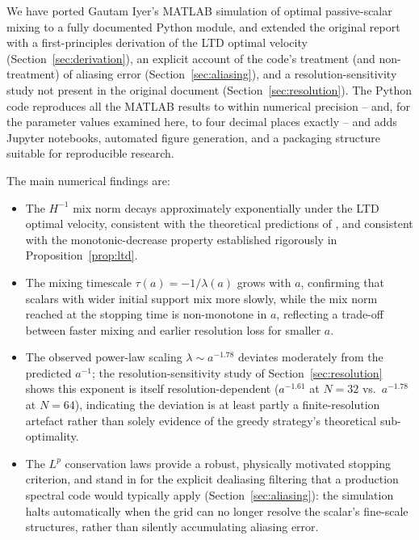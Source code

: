 \documentclass[12pt,a4paper]{article}
\theoremstyle{definition}
\theoremstyle{plain}
\begin{document}
We have ported Gautam Iyer's MATLAB simulation of optimal passive-scalar
mixing to a fully documented Python module, and extended the original
report with a first-principles derivation of the LTD optimal velocity
(Section~\ref{sec:derivation}), an explicit account of the code's
treatment (and non-treatment) of aliasing error (Section~\ref{sec:aliasing}),
and a resolution-sensitivity study not present in the original document
(Section~\ref{sec:resolution}).
The Python code reproduces all the MATLAB results to within numerical
precision -- and, for the parameter values examined here, to four decimal
places exactly -- and adds Jupyter notebooks, automated figure generation,
and a packaging structure suitable for reproducible research.

The main numerical findings are:
\begin{itemize}
  \item The $H^{-1}$ mix norm decays approximately exponentially under the
        LTD optimal velocity, consistent with the theoretical predictions of
        \cite{LTD2011}, and consistent with the monotonic-decrease property
        established rigorously in Proposition~\ref{prop:ltd}.
  \item The mixing timescale $\tau(a) = -1/\lambda(a)$ grows with $a$,
        confirming that scalars with wider initial support mix more slowly,
        while the mix norm reached at the stopping time is non-monotone in
        $a$, reflecting a trade-off between faster mixing and earlier
        resolution loss for smaller $a$.
  \item The observed power-law scaling $\lambda\sim a^{-1.78}$ deviates
        moderately from the predicted $a^{-1}$; the resolution-sensitivity
        study of Section~\ref{sec:resolution} shows this exponent is itself
        resolution-dependent ($a^{-1.61}$ at $N=32$ vs.\ $a^{-1.78}$ at
        $N=64$), indicating the deviation is at least partly a
        finite-resolution artefact rather than solely evidence of the
        greedy strategy's theoretical sub-optimality.
  \item The $L^p$ conservation laws provide a robust, physically motivated
        stopping criterion, and stand in for the explicit dealiasing
        filtering that a production spectral code would typically apply
        (Section~\ref{sec:aliasing}): the simulation halts automatically
        when the grid can no longer resolve the scalar's fine-scale
        structures, rather than silently accumulating aliasing error.
\end{itemize}
\end{document}
